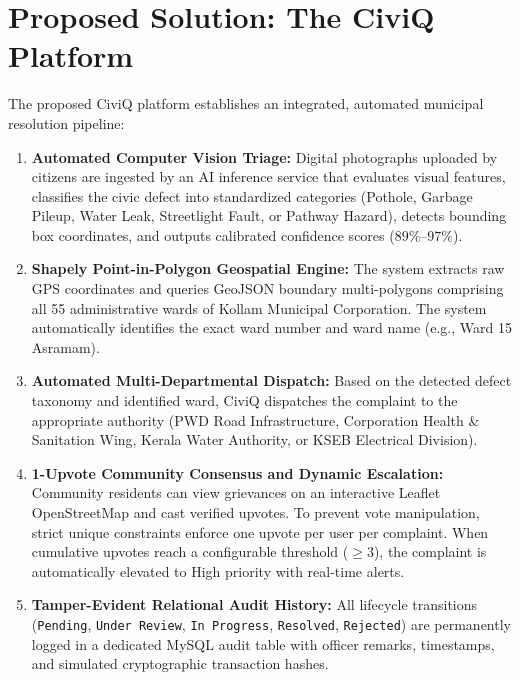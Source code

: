 \documentclass[12pt,a4paper]{report}
\begin{document}
\section{Proposed Solution: The CiviQ Platform}
The proposed CiviQ platform establishes an integrated, automated municipal resolution pipeline:
\begin{enumerate}
    \item \textbf{Automated Computer Vision Triage:} Digital photographs uploaded by citizens are ingested by an AI inference service that evaluates visual features, classifies the civic defect into standardized categories (Pothole, Garbage Pileup, Water Leak, Streetlight Fault, or Pathway Hazard), detects bounding box coordinates, and outputs calibrated confidence scores ($89\%$--$97\%$).
    \item \textbf{Shapely Point-in-Polygon Geospatial Engine:} The system extracts raw GPS coordinates and queries GeoJSON boundary multi-polygons comprising all 55 administrative wards of Kollam Municipal Corporation. The system automatically identifies the exact ward number and ward name (e.g., Ward 15 Asramam).
    \item \textbf{Automated Multi-Departmental Dispatch:} Based on the detected defect taxonomy and identified ward, CiviQ dispatches the complaint to the appropriate authority (PWD Road Infrastructure, Corporation Health \& Sanitation Wing, Kerala Water Authority, or KSEB Electrical Division).
    \item \textbf{1-Upvote Community Consensus and Dynamic Escalation:} Community residents can view grievances on an interactive Leaflet OpenStreetMap and cast verified upvotes. To prevent vote manipulation, strict unique constraints enforce one upvote per user per complaint. When cumulative upvotes reach a configurable threshold ($\ge 3$), the complaint is automatically elevated to High priority with real-time alerts.
    \item \textbf{Tamper-Evident Relational Audit History:} All lifecycle transitions (\texttt{Pending}, \texttt{Under Review}, \texttt{In Progress}, \texttt{Resolved}, \texttt{Rejected}) are permanently logged in a dedicated MySQL audit table with officer remarks, timestamps, and simulated cryptographic transaction hashes.
\end{enumerate}
\end{document}
